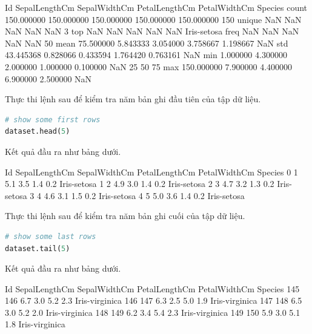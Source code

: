 \begin{terminaloutput}
       Id         SepalLengthCm SepalWidthCm PetalLengthCm PetalWidthCm Species
count  150.000000 150.000000    150.000000   150.000000    150.000000   150
unique NaN        NaN           NaN          NaN           NaN          3
top    NaN        NaN           NaN          NaN           NaN          Iris-setosa
freq   NaN        NaN           NaN          NaN           NaN          50
mean   75.500000  5.843333      3.054000     3.758667      1.198667     NaN
std    43.445368  0.828066      0.433594     1.764420      0.763161     NaN
min    1.000000   4.300000      2.000000     1.000000      0.100000     NaN
25%
50%
75%
max    150.000000 7.900000      4.400000     6.900000      2.500000     NaN
\end{terminaloutput}

Thực thi lệnh sau để kiểm tra năm bản ghi đầu tiên của tập dữ liệu.

\begin{lstlisting}[language=Python]
# show some first rows
dataset.head(5)
\end{lstlisting}

Kết quả đầu ra như bảng dưới.

\begin{terminaloutput}
  Id SepalLengthCm SepalWidthCm PetalLengthCm PetalWidthCm Species
0 1  5.1           3.5          1.4           0.2          Iris-setosa
1 2  4.9           3.0          1.4           0.2          Iris-setosa
2 3  4.7           3.2          1.3           0.2          Iris-setosa
3 4  4.6           3.1          1.5           0.2          Iris-setosa
4 5  5.0           3.6          1.4           0.2          Iris-setosa
\end{terminaloutput}

Thực thi lệnh sau để kiểm tra năm bản ghi cuối của tập dữ liệu.

\begin{lstlisting}[language=Python]
# show some last rows
dataset.tail(5)
\end{lstlisting}

Kết quả đầu ra như bảng dưới.

\begin{terminaloutput}
    Id  SepalLengthCm SepalWidthCm PetalLengthCm PetalWidthCm Species
145 146 6.7           3.0          5.2           2.3          Iris-virginica
146 147 6.3           2.5          5.0           1.9          Iris-virginica
147 148 6.5           3.0          5.2           2.0          Iris-virginica
148 149 6.2           3.4          5.4           2.3          Iris-virginica
149 150 5.9           3.0          5.1           1.8          Iris-virginica
\end{terminaloutput}

